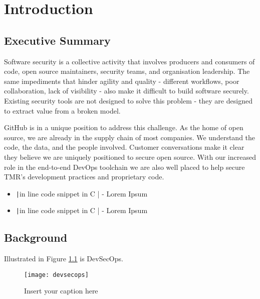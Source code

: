 \chapter{Introduction}
\section{Executive Summary}

Software security is a collective activity that involves producers and consumers of code, open source maintainers, security teams, and organisation leadership.
The same impediments that hinder agility and quality - different workflows, poor collaboration, lack of visibility - also make it difficult to build software securely.
Existing security tools are not designed to solve this problem - they are designed to extract value from a broken model.

GitHub is in a unique position to address this challenge. As the home of open source, we are already in the supply chain of most companies. We understand the code, the data, and the people involved. Customer conversations make it clear they believe we are uniquely positioned to secure open source. With our increased role in the end-to-end DevOps toolchain we are also well placed to help secure TMR’s development practices and proprietary code.

\begin{itemize}
  \item \texttt|in line code snippet in C | - Lorem Ipsum
  \item \texttt|in line code snippet in C | - Lorem Ipsum
\end{itemize}

\newpage

\section{Background}

Illustrated in Figure \ref{fig:devsecops} is DevSecOps.

\lipsum[1-2]

\begin{figure}[h]
  \centering
  \texttt{[image: devsecops]}
  \caption{Insert your caption here}
  \label{fig:devsecops}
\end{figure}


